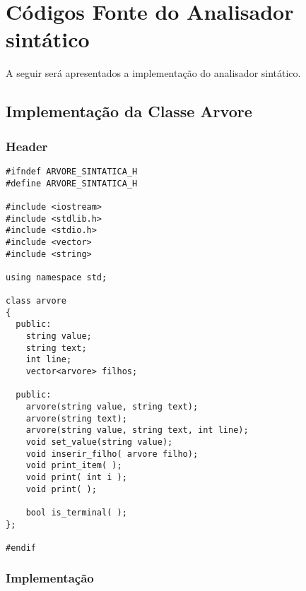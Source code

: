 \section{Códigos Fonte do Analisador sintático}
A seguir será apresentados a implementação do analisador sintático.

\clearpage


\subsection{Implementação da Classe Arvore}

\subsubsection{Header}

\begin{lstlisting}
#ifndef ARVORE_SINTATICA_H
#define ARVORE_SINTATICA_H

#include <iostream>
#include <stdlib.h>
#include <stdio.h>
#include <vector>
#include <string>

using namespace std;

class arvore
{
  public:
    string value;
    string text;
    int line;
    vector<arvore> filhos;

  public:
    arvore(string value, string text);
    arvore(string text);
    arvore(string value, string text, int line);
    void set_value(string value);
    void inserir_filho( arvore filho);
    void print_item( );
    void print( int i );
    void print( );

    bool is_terminal( );
};

#endif
\end{lstlisting}

\subsubsection{Implementaç\~ao}

